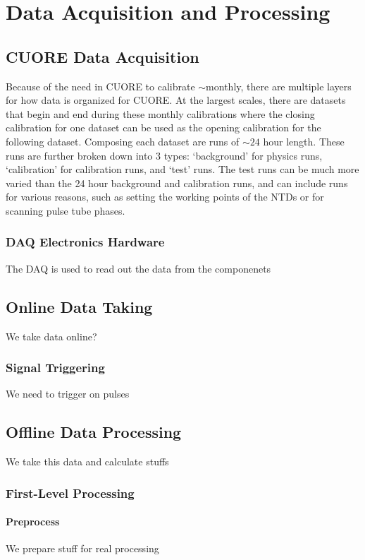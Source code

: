 \chapter{Data Acquisition and Processing}
\label{ch:Data Acquisition and Processing}

\section{CUORE Data Acquisition}
Because of the need in CUORE to calibrate $\sim$monthly, there are multiple layers for how data is organized for CUORE.
At the largest scales, there are datasets that begin and end during these monthly calibrations where the closing calibration for one dataset can be used as the opening calibration for the following dataset.
Composing each dataset are runs of $\sim24$ hour length.
These runs are further broken down into 3 types: `background' for physics runs, `calibration' for calibration runs, and `test' runs.
The test runs can be much more varied than the 24 hour background and calibration runs, and can include runs for various reasons, such as setting the working points of the NTDs or for scanning pulse tube phases.



\subsection{DAQ Electronics Hardware}
The DAQ is used to read out the data from the componenets
\section{Online Data Taking}
We take data online?
\subsection{Signal Triggering}
We need to trigger on pulses
\section{Offline Data Processing}
We take this data and calculate stuffs
\subsection{First-Level Processing}
\subsubsection{Preprocess}
We prepare stuff for real processing
